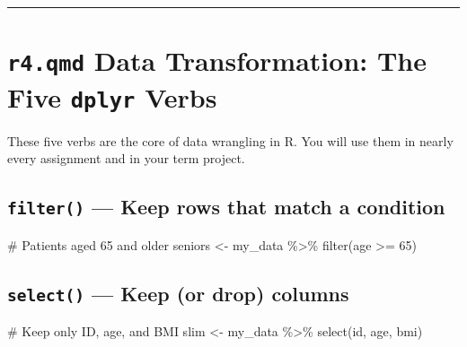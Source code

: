 \documentclass[
  letterpaper,
  DIV=11,
  numbers=noendperiod,
  oneside]{scrreprt}
\newenvironment{Shaded}{\begin{snugshade}}{\end{snugshade}}
\newcommand{\CommentTok}[1]{\textcolor[rgb]{0.37,0.37,0.37}{#1}}
\newcommand{\DecValTok}[1]{\textcolor[rgb]{0.68,0.00,0.00}{#1}}
\newcommand{\FunctionTok}[1]{\textcolor[rgb]{0.28,0.35,0.67}{#1}}
\newcommand{\NormalTok}[1]{\textcolor[rgb]{0.00,0.23,0.31}{#1}}
\newcommand{\OtherTok}[1]{\textcolor[rgb]{0.00,0.23,0.31}{#1}}
\newcommand{\SpecialCharTok}[1]{\textcolor[rgb]{0.37,0.37,0.37}{#1}}
\begin{document}
\begin{center}\rule{0.5\linewidth}{0.5pt}\end{center}

\section*{\texorpdfstring{\texttt{r4.qmd} Data Transformation: The Five
\texttt{dplyr}
Verbs}{r4.qmd Data Transformation: The Five dplyr Verbs}}\label{r4.qmd-data-transformation-the-five-dplyr-verbs}


These five verbs are the core of data wrangling in R. You will use them
in nearly every assignment and in your term project.

\subsection*{\texorpdfstring{\texttt{filter()} --- Keep rows that match
a
condition}{filter() --- Keep rows that match a condition}}\label{filter-keep-rows-that-match-a-condition}

\begin{Shaded}
\begin{Highlighting}[numbers=left,,]
\CommentTok{\# Patients aged 65 and older}
\NormalTok{seniors }\OtherTok{\textless{}{-}}\NormalTok{ my\_data }\SpecialCharTok{\%\textgreater{}\%} \FunctionTok{filter}\NormalTok{(age }\SpecialCharTok{\textgreater{}=} \DecValTok{65}\NormalTok{)}
\end{Highlighting}
\end{Shaded}

\subsection*{\texorpdfstring{\texttt{select()} --- Keep (or drop)
columns}{select() --- Keep (or drop) columns}}\label{select-keep-or-drop-columns}

\begin{Shaded}
\begin{Highlighting}[numbers=left,,]
\CommentTok{\# Keep only ID, age, and BMI}
\NormalTok{slim }\OtherTok{\textless{}{-}}\NormalTok{ my\_data }\SpecialCharTok{\%\textgreater{}\%} \FunctionTok{select}\NormalTok{(id, age, bmi)}
\end{Highlighting}
\end{Shaded}
\end{document}
